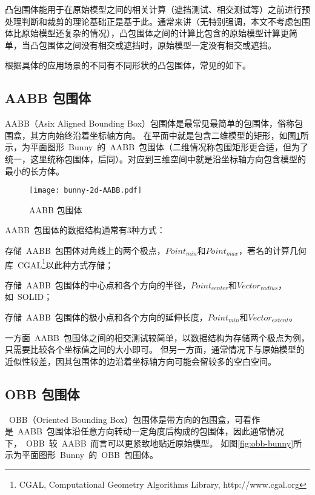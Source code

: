凸包围体能用于在原始模型之间的相关计算（遮挡测试、相交测试等）之前进行预处理判断和裁剪的理论基础正是基于此。通常来讲（无特别强调，本文不考虑包围体比原始模型还复杂的情况），凸包围体之间的计算比包含的原始模型计算更简单，当凸包围体之间没有相交或遮挡时，原始模型一定没有相交或遮挡。

根据具体的应用场景的不同有不同形状的凸包围体，常见的如下。

\subsection{AABB 包围体}

AABB（Asix Aligned Bounding Box）包围体是最常见最简单的包围体，俗称包围盒，其方向始终沿着坐标轴方向\cite{bergen1997efficient}。
在平面中就是包含二维模型的矩形，如图\ref{fig:aabb-bunny}所示，为平面图形~Bunny~的~AABB~包围体（二维情况称包围矩形更合适，但为了统一，这里统称包围体，后同）。对应到三维空间中就是沿坐标轴方向包含模型的最小的长方体。

\begin{figure}[htbp] %
  \centering
  \texttt{[image: bunny-2d-AABB.pdf]}
  \caption{AABB 包围体}
  \label{fig:aabb-bunny}
\end{figure}

AABB~包围体的数据结构通常有3种方式：
\begin{inparaenum}[(1)]
\item 存储~AABB~包围体对角线上的两个极点，$Point_{min}$和$Point_{max}$，著名的计算几何库~CGAL\footnote{CGAL, Computational Geometry Algorithms Library, http://www.cgal.org}以此种方式存储；
\item 存储~AABB~包围体的中心点和各个方向的半径，$Point_{center}$和$Vector_{radius}$，如~SOLID\cite{bergen1997efficient}；
\item 存储~AABB~包围体的极小点和各个方向的延伸长度\cite{ericson2005real}，$Point_{min}$和$Vector_{extent}$。
\end{inparaenum} 

一方面~AABB~包围体之间的相交测试较简单，以数据结构为存储两个极点为例，只需要比较各个坐标值之间的大小即可。
但另一方面，通常情况下与原始模型的近似性较差，因其包围体的边沿着坐标轴方向可能会留较多的空白空间。

\subsection{OBB 包围体}

~OBB（Oriented Bounding Box）包围体是带方向的包围盒，可看作是~AABB~包围体沿任意方向转动一定角度后构成的包围体，因此通常情况下，~OBB~较~AABB~而言可以更紧致地贴近原始模型。
如图\ref{fig:obb-bunny}所示为平面图形~Bunny~的~OBB~包围体。

